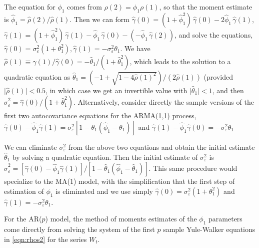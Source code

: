 \begin{ex}
 The equation for $\phi_1$ comes from $\rho(2) = \phi_1 \rho(1)$, so that the moment estimate is $\hat{\phi}_1 = \hat{\rho}(2) / \hat{\rho}(1)$. Then we can form $\hat{\gamma}(0) = (1+\hat{\phi}_1^2)\,\hat{\gamma}(0) - 2\hat{\phi}_1\,\hat{\gamma}(1)$, $\hat{\gamma}(1) = (1+\hat{\phi}_1^2)\,\hat{\gamma}(1) - \hat{\phi}_1\,\hat{\gamma}(0) - (- \hat{\phi}_1\,\hat{\gamma}(2))$, and solve the equations, $\hat{\gamma}(0) = \sigma_{\varepsilon}^2(1 + \theta_1^2), \hat{\gamma}(1) = -\sigma_{\varepsilon}^2\theta_1$. We have $\hat{\rho}(1) \equiv \hat{\gamma}(1)/\hat{\gamma}(0) = -\hat{\theta}_1/(1 + \hat{\theta}_1^2)$, which leads to the solution to a quadratic equation as $\hat{\theta}_1 = \left(-1 + \sqrt{1-4\hat{\rho}(1)^2} \right) / (2\hat{\rho}(1))$ (provided $\lvert \hat{\rho}(1) \rvert < 0.5$, in which case we get an invertible value with $\lvert \hat{\theta}_1 \rvert < 1$, and then $\hat{\sigma}_{\varepsilon}^2 = \hat{\gamma}(0)/(1+\hat{\theta}_1^2)$. Alternatively, consider directly the sample versions of the first two autocovariance equations for the ARMA(1,1) process, $\hat{\gamma}(0) - \hat{\phi}_1\hat{\gamma}(1) = \sigma_{\varepsilon}^2[1 - \theta_1(\hat{\phi}_1 - \theta_1)]$ and $\hat{\gamma}(1) - \hat{\phi}_1\hat{\gamma}(0) = -\sigma_{\varepsilon}^2\theta_1$

We can eliminate $\sigma_{\varepsilon}^2$ from the above two equations and obtain the initial estimate $\hat{\theta}_1$ by solving a quadratic equation. Then the initial estimate of $\sigma_{\varepsilon}^2$ is $\hat{\sigma}_{\varepsilon}^2 = [\hat{\gamma}(0) - \hat{\phi}_1\hat{\gamma}(1)]/[1 - \hat{\theta}_1(\hat{\phi}_1 - \hat{\theta}_1)]$. This same procedure would specialize to the MA(1) model, with the simplification that the first step of estimation of $\phi_1$ is eliminated and we use simply $\hat{\gamma}(0) = \sigma_{\varepsilon}^2(1 + \theta_1^2)$ and $\hat{\gamma}(1) = -\sigma_{\varepsilon}^2\theta_1$. \xqed
 \end{ex}


\begin{ex}[AR($p$) Model]
 For the AR($p$) model, the method of moments estimates of the $\phi_1$ parameters come directly from solving the system of the first $p$ sample Yule-Walker equations in \eqref{eqn:rhos2} for the series $W_t$. \xqed
\end{ex}


